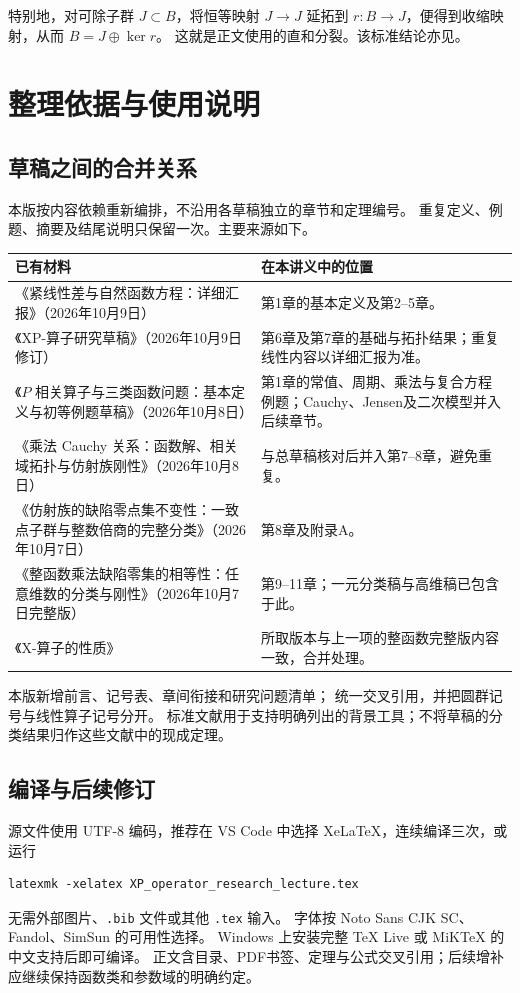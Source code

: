 \documentclass[11pt,a4paper,oneside,openany]{book}
\theoremstyle{lecture}
\numberwithin{equation}{section}
\begin{document}
特别地，对可除子群 $J\subset B$，将恒等映射 $J\to J$ 延拓到
$r:B\to J$，便得到收缩映射，从而 $B=J\oplus\ker r$。
这就是正文使用的直和分裂。该标准结论亦见\cite{stacks}。


\chapter{整理依据与使用说明}\label{app:sources}
\section{草稿之间的合并关系}
本版按内容依赖重新编排，不沿用各草稿独立的章节和定理编号。
重复定义、例题、摘要及结尾说明只保留一次。主要来源如下。
\begin{longtable}{@{}p{}p{}@{}}
\toprule 已有材料 & 在本讲义中的位置 \\\midrule
\endhead
《紧线性差与自然函数方程：详细汇报》（2026年10月9日） & 第1章的基本定义及第2--5章。\\
《XP-算子研究草稿》（2026年10月9日修订） & 第6章及第7章的基础与拓扑结果；重复线性内容以详细汇报为准。\\
《$P$ 相关算子与三类函数问题：基本定义与初等例题草稿》（2026年10月8日） & 第1章的常值、周期、乘法与复合方程例题；Cauchy、Jensen及二次模型并入后续章节。\\
《乘法 Cauchy 关系：函数解、相关域拓扑与仿射族刚性》（2026年10月8日） & 与总草稿核对后并入第7--8章，避免重复。\\
《仿射族的缺陷零点集不变性：一致点子群与整数倍商的完整分类》（2026年10月7日） & 第8章及附录A。\\
《整函数乘法缺陷零集的相等性：任意维数的分类与刚性》（2026年10月7日完整版） & 第9--11章；一元分类稿与高维稿已包含于此。\\
《X-算子的性质》 & 所取版本与上一项的整函数完整版内容一致，合并处理。\\
\bottomrule
\end{longtable}
本版新增前言、记号表、章间衔接和研究问题清单；
统一交叉引用，并把圆群记号与线性算子记号分开。
标准文献用于支持明确列出的背景工具；不将草稿的分类结果归作这些文献中的现成定理。

\section{编译与后续修订}
源文件使用 UTF-8 编码，推荐在 VS Code 中选择 XeLaTeX，连续编译三次，或运行
\begin{verbatim}
latexmk -xelatex XP_operator_research_lecture.tex
\end{verbatim}
无需外部图片、\texttt{.bib} 文件或其他 \texttt{.tex} 输入。
字体按 Noto Sans CJK SC、Fandol、SimSun 的可用性选择。
Windows 上安装完整 TeX Live 或 MiKTeX 的中文支持后即可编译。
正文含目录、PDF书签、定理与公式交叉引用；后续增补应继续保持函数类和参数域的明确约定。
\end{document}

